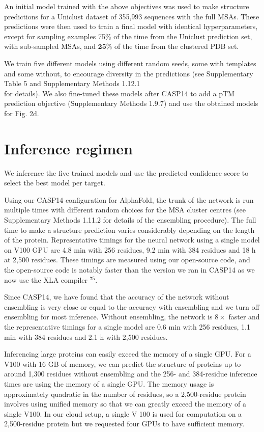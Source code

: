 \documentclass[10pt]{article}
\begin{document}
An initial model trained with the above objectives was used to make structure predictions for a Uniclust dataset of 355,993 sequences with the full MSAs. These predictions were then used to train a final model with identical hyperparameters, except for sampling examples 75\% of the time from the Uniclust prediction set, with sub-sampled MSAs, and $\mathbf{2 5 \%}$ of the time from the clustered PDB set.

We train five different models using different random seeds, some with templates and some without, to encourage diversity in the predictions (see Supplementary Table 5 and Supplementary Methods 1.12.1\\
for details). We also fine-tuned these models after CASP14 to add a pTM prediction objective (Supplementary Methods 1.9.7) and use the obtained models for Fig. 2d.

\section*{Inference regimen}
We inference the five trained models and use the predicted confidence score to select the best model per target.

Using our CASP14 configuration for AlphaFold, the trunk of the network is run multiple times with different random choices for the MSA cluster centres (see Supplementary Methods 1.11.2 for details of the ensembling procedure). The full time to make a structure prediction varies considerably depending on the length of the protein. Representative timings for the neural network using a single model on V100 GPU are 4.8 min with 256 residues, 9.2 min with 384 residues and 18 h at 2,500 residues. These timings are measured using our open-source code, and the open-source code is notably faster than the version we ran in CASP14 as we now use the XLA compiler ${ }^{75}$.

Since CASP14, we have found that the accuracy of the network without ensembling is very close or equal to the accuracy with ensembling and we turn off ensembling for most inference. Without ensembling, the network is $8 \times$ faster and the representative timings for a single model are 0.6 min with 256 residues, 1.1 min with 384 residues and 2.1 h with 2,500 residues.

Inferencing large proteins can easily exceed the memory of a single GPU. For a V100 with 16 GB of memory, we can predict the structure of proteins up to around 1,300 residues without ensembling and the 256- and 384-residue inference times are using the memory of a single GPU. The memory usage is approximately quadratic in the number of residues, so a 2,500-residue protein involves using unified memory so that we can greatly exceed the memory of a single V100. In our cloud setup, a single V 100 is used for computation on a 2,500-residue protein but we requested four GPUs to have sufficient memory.
\end{document}

